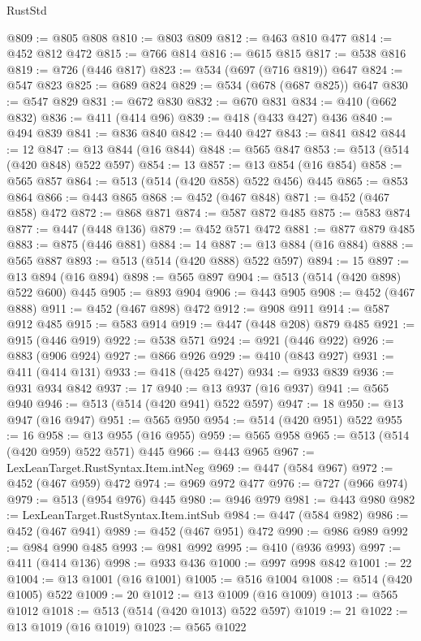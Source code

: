 \begin{lexlean}{RustStd}
\begin{coremodule}
@809 := @805 @808
@810 := @803 @809
@812 := @463 @810 @477
@814 := @452 @812 @472
@815 := @766 @814
@816 := @615 @815
@817 := @538 @816
@819 := @726 (@446 @817)
@823 := @534 (@697 (@716 @819)) @647
@824 := @547 @823
@825 := @689 @824
@829 := @534 (@678 (@687 @825)) @647
@830 := @547 @829
@831 := @672 @830
@832 := @670 @831
@834 := @410 (@662 @832)
@836 := @411 (@414 @96)
@839 := @418 (@433 @427) @436
@840 := @494 @839
@841 := @836 @840
@842 := @440 @427
@843 := @841 @842
@844 := 12
@847 := @13 @844 (@16 @844)
@848 := @565 @847
@853 := @513 (@514 (@420 @848) @522 @597)
@854 := 13
@857 := @13 @854 (@16 @854)
@858 := @565 @857
@864 := @513 (@514 (@420 @858) @522 @456) @445
@865 := @853 @864
@866 := @443 @865
@868 := @452 (@467 @848)
@871 := @452 (@467 @858) @472
@872 := @868 @871
@874 := @587 @872 @485
@875 := @583 @874
@877 := @447 (@448 @136)
@879 := @452 @571 @472
@881 := @877 @879 @485
@883 := @875 (@446 @881)
@884 := 14
@887 := @13 @884 (@16 @884)
@888 := @565 @887
@893 := @513 (@514 (@420 @888) @522 @597)
@894 := 15
@897 := @13 @894 (@16 @894)
@898 := @565 @897
@904 := @513 (@514 (@420 @898) @522 @600) @445
@905 := @893 @904
@906 := @443 @905
@908 := @452 (@467 @888)
@911 := @452 (@467 @898) @472
@912 := @908 @911
@914 := @587 @912 @485
@915 := @583 @914
@919 := @447 (@448 @208) @879 @485
@921 := @915 (@446 @919)
@922 := @538 @571
@924 := @921 (@446 @922)
@926 := @883 (@906 @924)
@927 := @866 @926
@929 := @410 (@843 @927)
@931 := @411 (@414 @131)
@933 := @418 (@425 @427)
@934 := @933 @839
@936 := @931 @934 @842
@937 := 17
@940 := @13 @937 (@16 @937)
@941 := @565 @940
@946 := @513 (@514 (@420 @941) @522 @597)
@947 := 18
@950 := @13 @947 (@16 @947)
@951 := @565 @950
@954 := @514 (@420 @951) @522
@955 := 16
@958 := @13 @955 (@16 @955)
@959 := @565 @958
@965 := @513 (@514 (@420 @959) @522 @571) @445
@966 := @443 @965
@967 := LexLeanTarget.RustSyntax.Item.intNeg
@969 := @447 (@584 @967)
@972 := @452 (@467 @959) @472
@974 := @969 @972 @477
@976 := @727 (@966 @974)
@979 := @513 (@954 @976) @445
@980 := @946 @979
@981 := @443 @980
@982 := LexLeanTarget.RustSyntax.Item.intSub
@984 := @447 (@584 @982)
@986 := @452 (@467 @941)
@989 := @452 (@467 @951) @472
@990 := @986 @989
@992 := @984 @990 @485
@993 := @981 @992
@995 := @410 (@936 @993)
@997 := @411 (@414 @136)
@998 := @933 @436
@1000 := @997 @998 @842
@1001 := 22
@1004 := @13 @1001 (@16 @1001)
@1005 := @516 @1004
@1008 := @514 (@420 @1005) @522
@1009 := 20
@1012 := @13 @1009 (@16 @1009)
@1013 := @565 @1012
@1018 := @513 (@514 (@420 @1013) @522 @597)
@1019 := 21
@1022 := @13 @1019 (@16 @1019)
@1023 := @565 @1022

\end{coremodule}
\end{lexlean}
